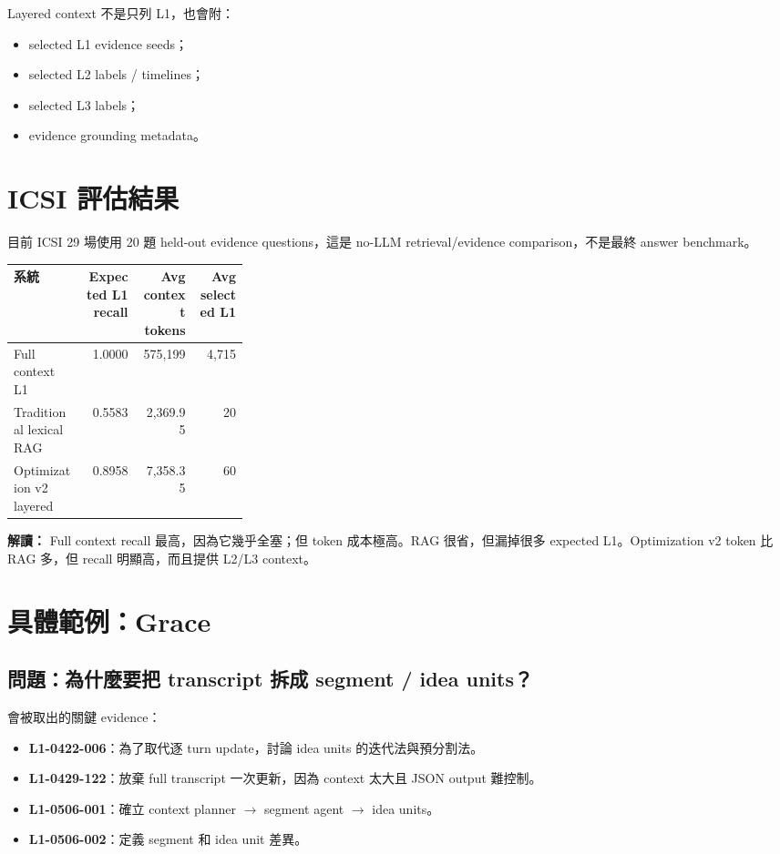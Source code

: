 \documentclass[11pt]{article}
\begin{document}
Layered context 不是只列 L1，也會附：
\begin{itemize}
  \item selected L1 evidence seeds；
  \item selected L2 labels / timelines；
  \item selected L3 labels；
  \item evidence grounding metadata。
\end{itemize}

\section{ICSI 評估結果}

目前 ICSI 29 場使用 20 題 held-out evidence questions，這是 no-LLM retrieval/evidence comparison，不是最終 answer benchmark。

\begin{longtable}{p{0.30\linewidth}rrr}
\toprule
\textbf{系統} & \textbf{Expected L1 recall} & \textbf{Avg context tokens} & \textbf{Avg selected L1}\\
\midrule
Full context L1 & 1.0000 & 575,199 & 4,715\\
Traditional lexical RAG & 0.5583 & 2,369.95 & 20\\
Optimization v2 layered & 0.8958 & 7,358.35 & 60\\
\bottomrule
\end{longtable}

\noindent\textbf{解讀：}
Full context recall 最高，因為它幾乎全塞；但 token 成本極高。RAG 很省，但漏掉很多 expected L1。Optimization v2 token 比 RAG 多，但 recall 明顯高，而且提供 L2/L3 context。

\section{具體範例：Grace}

\subsection{問題：為什麼要把 transcript 拆成 segment / idea units？}

會被取出的關鍵 evidence：
\begin{itemize}
  \item \textbf{L1-0422-006}：為了取代逐 turn update，討論 idea units 的迭代法與預分割法。
  \item \textbf{L1-0429-122}：放棄 full transcript 一次更新，因為 context 太大且 JSON output 難控制。
  \item \textbf{L1-0506-001}：確立 context planner \(\rightarrow\) segment agent \(\rightarrow\) idea units。
  \item \textbf{L1-0506-002}：定義 segment 和 idea unit 差異。
\end{itemize}
\end{document}
